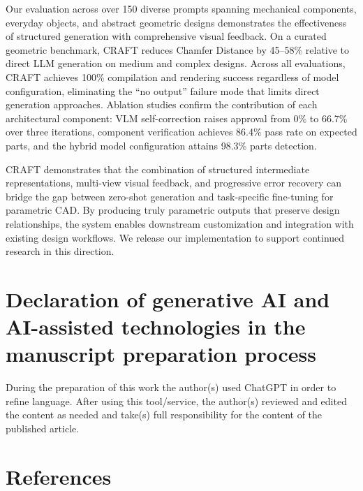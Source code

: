\documentclass[5p,twocolumn,10pt,times]{elsarticle}
\begin{document}
Our evaluation across over 150 diverse prompts spanning mechanical components, everyday objects, and abstract geometric designs demonstrates the effectiveness of structured generation with comprehensive visual feedback. On a curated geometric benchmark, CRAFT reduces Chamfer Distance by 45--58\% relative to direct LLM generation on medium and complex designs. Across all evaluations, CRAFT achieves 100\% compilation and rendering success regardless of model configuration, eliminating the ``no output'' failure mode that limits direct generation approaches. Ablation studies confirm the contribution of each architectural component: VLM self-correction raises approval from 0\% to 66.7\% over three iterations, component verification achieves 86.4\% pass rate on expected parts, and the hybrid model configuration attains 98.3\% parts detection.

CRAFT demonstrates that the combination of structured intermediate representations, multi-view visual feedback, and progressive error recovery can bridge the gap between zero-shot generation and task-specific fine-tuning for parametric CAD. By producing truly parametric outputs that preserve design relationships, the system enables downstream customization and integration with existing design workflows. We release our implementation to support continued research in this direction.

\section{Declaration of generative AI and AI-assisted technologies in the manuscript preparation process}
During the preparation of this work the author(s) used ChatGPT in order to refine language. After using this tool/service, the author(s) reviewed and edited the content as needed and take(s) full responsibility for the content of the published article.
\clearpage
\section*{References}


\end{document}
